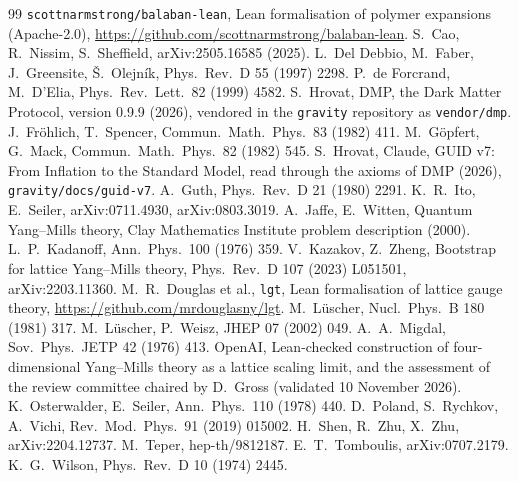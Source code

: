 \documentclass[11pt,a4paper]{article}
\begin{document}
\begin{thebibliography}{99}\small
{} \texttt{scottnarmstrong/balaban-lean}, Lean formalisation of polymer expansions (Apache-2.0),
  \url{https://github.com/scottnarmstrong/balaban-lean}.
 S.~Cao, R.~Nissim, S.~Sheffield, arXiv:2505.16585 (2025).
 L.~Del Debbio, M.~Faber, J.~Greensite, \v{S}.~Olejn\'ik, Phys.\ Rev.\ D 55 (1997) 2298.
 P.~de Forcrand, M.~D'Elia, Phys.\ Rev.\ Lett.\ 82 (1999) 4582.
 S.~Hrovat, DMP, the Dark Matter Protocol, version 0.9.9 (2026), vendored in the \texttt{gravity} repository as \texttt{vendor/dmp}.
 J.~Fr\"ohlich, T.~Spencer, Commun.\ Math.\ Phys.\ 83 (1982) 411.
 M.~G\"opfert, G.~Mack, Commun.\ Math.\ Phys.\ 82 (1982) 545.
 S.~Hrovat, Claude, GUID v7: From Inflation to the Standard Model, read through the axioms of DMP (2026),
  \texttt{gravity/docs/guid-v7}.
 A.~Guth, Phys.\ Rev.\ D 21 (1980) 2291.
 K.~R.~Ito, E.~Seiler, arXiv:0711.4930, arXiv:0803.3019.
 A.~Jaffe, E.~Witten, Quantum Yang--Mills theory, Clay Mathematics Institute problem description (2000).
 L.~P.~Kadanoff, Ann.\ Phys.\ 100 (1976) 359.
 V.~Kazakov, Z.~Zheng, Bootstrap for lattice Yang--Mills theory, Phys.\ Rev.\ D 107 (2023) L051501, arXiv:2203.11360.
 M.~R.~Douglas et al., \texttt{lgt}, Lean formalisation of lattice gauge theory, \url{https://github.com/mrdouglasny/lgt}.
 M.~L\"uscher, Nucl.\ Phys.\ B 180 (1981) 317.
 M.~L\"uscher, P.~Weisz, JHEP 07 (2002) 049.
 A.~A.~Migdal, Sov.\ Phys.\ JETP 42 (1976) 413.
 OpenAI, Lean-checked construction of four-dimensional Yang--Mills theory as a lattice scaling limit, and the
  assessment of the review committee chaired by D.~Gross (validated 10 November 2026).
 K.~Osterwalder, E.~Seiler, Ann.\ Phys.\ 110 (1978) 440.
 D.~Poland, S.~Rychkov, A.~Vichi, Rev.\ Mod.\ Phys.\ 91 (2019) 015002.
 H.~Shen, R.~Zhu, X.~Zhu, arXiv:2204.12737.
 M.~Teper, hep-th/9812187.
 E.~T.~Tomboulis, arXiv:0707.2179.
 K.~G.~Wilson, Phys.\ Rev.\ D 10 (1974) 2445.
\end{thebibliography}
\end{document}
